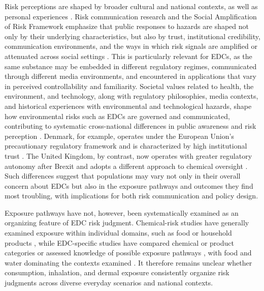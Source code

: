 Risk perceptions are shaped by broader cultural and national contexts, as well as personal experiences \citep{weber2006experience, knuth2014risk}. Risk communication research and the Social Amplification of Risk Framework \citep{kasperson1988social,pidgeon2003social} emphasize that public responses to hazards are shaped not only by their underlying characteristics, but also by trust, institutional credibility, communication environments, and the ways in which risk signals are amplified or attenuated across social settings \citep{bearth2022social,kasperson2022social}. This is particularly relevant for EDCs, as the same substance may be embedded in different regulatory regimes, communicated through different media environments, and encountered in applications that vary in perceived controllability and familiarity. Societal values related to health, the environment, and technology, along with regulatory philosophies, media contexts, and historical experiences with environmental and technological hazards, shape how environmental risks such as EDCs are governed and communicated, contributing to systematic cross-national differences in public awareness and risk perception \citep{clahsen2019countries, renn2013cross}. Denmark, for example, operates under the European Union’s precautionary regulatory framework \citep{ecReachRestrictions} and is characterized by high institutional trust \citep{oecdTrust2024}. The United Kingdom, by contrast, now operates with greater regulatory autonomy after Brexit and adopts a different approach to chemical oversight \citep{hseUkReachExplained}. Such differences suggest that populations may vary not only in their overall concern about EDCs but also in the exposure pathways and outcomes they find most troubling, with implications for both risk communication and policy design.

Exposure pathways have not, however, been systematically examined as an organizing feature of EDC risk judgment. Chemical-risk studies have generally examined exposure within individual domains, such as food or household products \citep{bearth2019situative, jansen2020all}, while EDC-specific studies have compared chemical or product categories or assessed knowledge of possible exposure pathways \citep{pravednikov2024main,boronow2025people}, with food and water dominating the contexts examined \citep{pravednikov2024main}. It therefore remains unclear whether consumption, inhalation, and dermal exposure consistently organize risk judgments across diverse everyday scenarios and national contexts.

